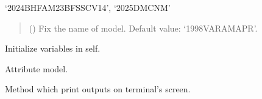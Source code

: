 \documentclass[letterpaper,10pt,english]{sphinxmanual}
\begin{document}
\begin{fulllineitems}
‘2024\sphinxhyphen{}BHF\sphinxhyphen{}AM\sphinxhyphen{}23BF\sphinxhyphen{}SSCV14’, ‘2025\sphinxhyphen{}DMC\sphinxhyphen{}NM’
\begin{quote}\begin{description}
\sphinxAtStartPar
{} (\sphinxstyleliteralemphasis{\sphinxupquote{, }}) \textendash{} Fix the name of model. Default value: ‘1998\sphinxhyphen{}VAR\sphinxhyphen{}AM\sphinxhyphen{}APR’.

\end{description}\end{quote}

\sphinxAtStartPar
{}

\begin{fulllineitems}
\label{\detokenize{source/api/setup_eos_micro:nucleardatapy.eos.setup_micro.setupMicro.init_self}}
\pysigstartsignatures
{}
\pysigstopsignatures
\sphinxAtStartPar
Initialize variables in self.

\end{fulllineitems}


\begin{fulllineitems}
\label{\detokenize{source/api/setup_eos_micro:nucleardatapy.eos.setup_micro.setupMicro.model}}
\pysigstartsignatures
{}
\pysigstopsignatures
\sphinxAtStartPar
Attribute model.

\end{fulllineitems}


\begin{fulllineitems}
\label{\detokenize{source/api/setup_eos_micro:nucleardatapy.eos.setup_micro.setupMicro.print_outputs}}
\pysigstartsignatures
{}
\pysigstopsignatures
\sphinxAtStartPar
Method which print outputs on terminal’s screen.

\end{fulllineitems}


\end{fulllineitems}
\end{document}
